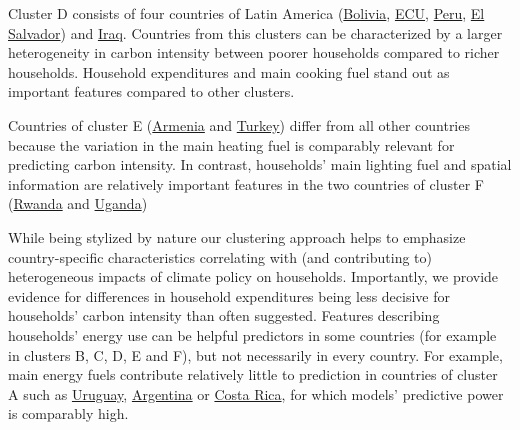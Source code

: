 \documentclass[12pt, a4paper]{article}
\begin{document}
Cluster D consists of four countries of Latin America (\hyperref[fig:5b_BOL]{Bolivia}, \hyperref[fig:5b_ECU]{ECU}, \hyperref[fig:5b_PER]{Peru}, \hyperref[fig:5b_SLV]{El Salvador}) and \hyperref[fig:5b_IRQ]{Iraq}. Countries from this clusters can be characterized by a larger heterogeneity in carbon intensity between poorer households compared to richer households. Household expenditures and main cooking fuel stand out as important features compared to other clusters. 

Countries of cluster E (\hyperref[fig:5b_ARM]{Armenia} and \hyperref[fig:5b_TUR]{Turkey}) differ from all other countries because the variation in the main heating fuel is comparably relevant for predicting carbon intensity. In contrast, households' main lighting fuel and spatial information are relatively important features in the two countries of cluster F (\hyperref[fig:5b_RWA]{Rwanda} and \hyperref[fig:5b_UGA]{Uganda})

While being stylized by nature our clustering approach helps to emphasize country-specific characteristics correlating with (and contributing to) heterogeneous impacts of climate policy on households. Importantly, we provide evidence for differences in household expenditures being less decisive for households' carbon intensity than often suggested. Features describing households' energy use can be helpful predictors in some countries (for example in clusters B, C, D, E and F), but not necessarily in every country. For example, main energy fuels contribute relatively little to prediction in countries of cluster A such as \hyperref[fig:5b_URY]{Uruguay}, \hyperref[fig:5b_URY]{Argentina} or \hyperref[fig:5b_CRI]{Costa Rica}, for which models' predictive power is comparably high.
\end{document}
